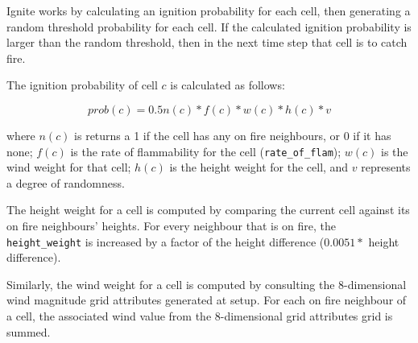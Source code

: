 \documentclass[11pt, a4paper, titlepage]{article}
\newcommand{\code}[1]{\colorbox{light-gray}{\texttt{#1}}}
\begin{document}





Ignite works by calculating an ignition probability for each cell, then generating a random threshold probability for each cell. If the calculated ignition probability is larger than the random threshold, then in the next time step that cell is to catch fire.

The ignition probability of cell $c$ is calculated as follows:

\[ prob(c) = 0.5n(c)*f(c)*w(c)*h(c)*v \]

where $n(c)$ is returns a 1 if the cell has any on fire neighbours, or 0 if it has none; $f(c)$ is the rate of flammability for the cell (\code{rate\_of\_flam}); $w(c)$ is the wind weight for that cell; $h(c)$ is the height weight for the cell, and $v$ represents a degree of randomness.

The height weight for a cell is computed by comparing the current cell against its on fire neighbours' heights. For every neighbour that is on fire, the \code{height\_weight} is increased by a factor of the height difference ($0.0051 *$ height difference).  

Similarly, the wind weight for a cell is computed by consulting the 8-dimensional wind magnitude grid attributes generated at setup. For each on fire neighbour of a cell, the associated wind value from the 8-dimensional grid attributes grid is summed.  


\end{document}
